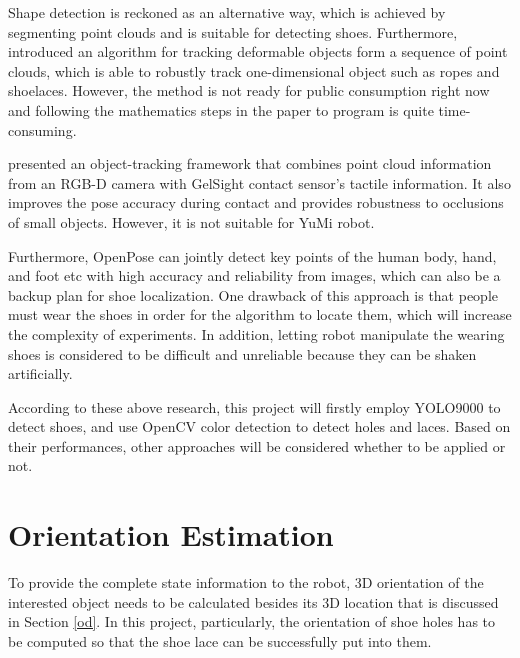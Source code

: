 Shape detection is reckoned as an alternative way, which is achieved by segmenting point clouds and is suitable for detecting shoes. Furthermore, \citep{deformable_track} introduced an algorithm for tracking deformable objects form a sequence of point clouds, which is able to robustly track one-dimensional object such as ropes and shoelaces. However, the method is not ready for public consumption right now and following the mathematics steps in the paper to program is quite time-consuming.

\citep{vision_touch} presented an object-tracking framework that combines point cloud information from an RGB-D camera with GelSight contact sensor's tactile information. It also improves the pose accuracy during contact and provides robustness to occlusions of small objects. However, it is not suitable for YuMi robot.

Furthermore, OpenPose \citep{openpose} can jointly detect key points of the human body, hand, and foot etc with high accuracy and reliability from images, which can also be a backup plan for shoe localization. One drawback of this approach is that people must wear the shoes in order for the algorithm to locate them, which will increase the complexity of experiments. In addition, letting robot manipulate the wearing shoes is considered to be difficult and unreliable because they can be shaken artificially.

According to these above research, this project will firstly employ YOLO9000 to detect shoes, and use OpenCV color detection to detect holes and laces. Based on their performances, other approaches will be considered whether to be applied or not.

\section{Orientation Estimation} \label{oriestimation}
To provide the complete state information to the robot, 3D orientation of the interested object needs to be calculated besides its 3D location that is discussed in Section \ref{od}. In this project, particularly, the orientation of shoe holes has to be computed so that the shoe lace can be successfully put into them.

